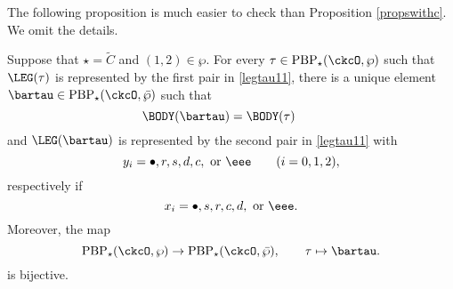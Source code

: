 \documentclass[ssunip]{subfiles}
\begin{document}

The following proposition is much easier to check than Proposition \ref{propswithc}. We omit the details. 
\begin{prop}\label{propswithc2}
Suppose that $\star=\widetilde C$ and $(1,2)\in \wp$. For every $\tau\in \mathrm{PBP}_\star(\ckcO,\wp ) $ such that $\LEG(\tau)$ is represented by the first pair  in \eqref{legtau11}, there is a unique element $\bartau\in \mathrm{PBP}_\star(\ckcO,\bar \wp ) $ such that 
 \[
    \BODY(\bartau) = \BODY(\tau) \qquad 
\]
and $\LEG(\bartau)$ is represented by the second pair  in \eqref{legtau11} with
\[
y_i = \bullet,r,s,d,c, \text{ or }\eee\qquad (i=0,1,2),
\]
respectively if 
\[
x_i = \bullet,s,r,c,d, \text{ or }\eee.  %
\]
Moreover, the map 
\[
 \mathrm{PBP}_\star(\ckcO,\wp)\rightarrow \mathrm{PBP}_\star(\ckcO,\bar \wp), \qquad
 \tau \mapsto \bartau. 
 \]
 is bijective.
\end{prop}



\end{document}
